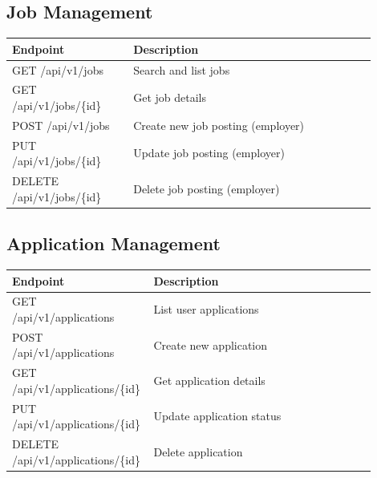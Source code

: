 \documentclass[12pt,a4paper]{report}
\begin{document}
\subsection{Job Management}
\begin{longtable}{p{0.3\linewidth} p{0.6\linewidth}}
\toprule
\textbf{Endpoint} & \textbf{Description}\\
\midrule
GET /api/v1/jobs & Search and list jobs\\
GET /api/v1/jobs/\{id\} & Get job details\\
POST /api/v1/jobs & Create new job posting (employer)\\
PUT /api/v1/jobs/\{id\} & Update job posting (employer)\\
DELETE /api/v1/jobs/\{id\} & Delete job posting (employer)\\
\bottomrule
\end{longtable}

\subsection{Application Management}
\begin{longtable}{p{0.3\linewidth} p{0.6\linewidth}}
\toprule
\textbf{Endpoint} & \textbf{Description}\\
\midrule
GET /api/v1/applications & List user applications\\
POST /api/v1/applications & Create new application\\
GET /api/v1/applications/\{id\} & Get application details\\
PUT /api/v1/applications/\{id\} & Update application status\\
DELETE /api/v1/applications/\{id\} & Delete application\\
\bottomrule
\end{longtable}
\end{document}

